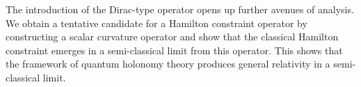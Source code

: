 \documentclass[12pt]{article}
\begin{document}
%
%
%





The introduction of the Dirac-type operator 
opens up further avenues of analysis. We obtain a tentative candidate for a Hamilton constraint operator by constructing a scalar curvature operator and show that the  classical Hamilton constraint emerges in a semi-classical limit from this operator. This shows that the framework of quantum holonomy theory produces general relativity in a semi-classical limit.
\end{document}
